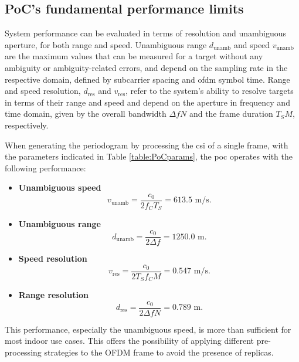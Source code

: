 	\subsection{PoC's fundamental performance limits}
		
		System performance can be evaluated in terms of resolution and unambiguous aperture, for both range and speed.
		Unambiguous range $d_{\text{unamb}}$ and speed $v_{\text{unamb}}$ are the maximum values that can be measured for a target without any ambiguity or ambiguity-related errors, and depend on the sampling rate in the respective domain, defined by subcarrier spacing and \gls{ofdm} symbol time.
		Range and speed resolution, $d_{\text{res}}$ and $v_{\text{res}}$, refer to the system's ability to resolve targets in terms of their range and speed and depend on the aperture in frequency and time domain, given by the overall bandwidth $\Delta f N$ and the frame duration $T_S M$, respectively. 
	
		When generating the periodogram by processing the \gls{csi} of a single frame, with the parameters indicated in Table \ref{table:PoCparams},
		the \gls{poc} operates with the following performance:
		
		\begin{itemize}
			\item \textbf{Unambiguous speed}
			\vspace{-\baselineskip} %
			\begin{equation}
				v_{\text{unamb}} = \frac{c_0}{2f_C T_S} = 613.5\text{ m/s}.
			\end{equation}
			
			\item \textbf{Unambiguous range}
			\begin{equation}
				d_{\text{unamb}} = \frac{c_0}{2\Delta f} = 1250.0\text{ m}.
			\end{equation}
			\item \textbf{Speed resolution}
			\begin{equation}
				v_{\text{res}} = \frac{c_0}{2T_Sf_CM} = 0.547 \text{ m/s}.
			\end{equation} 
			\item \textbf{Range resolution}
			\begin{equation}
				d_{\text{res}} = \frac{c_0}{2\Delta fN} = 0.789 \text{ m}.
			\end{equation}  
		\end{itemize}
			This performance, especially the unambiguous speed, is more than sufficient for most indoor use cases. 
			This offers the possibility of applying different pre-processing strategies to the OFDM frame to avoid the presence of replicas. 
			

